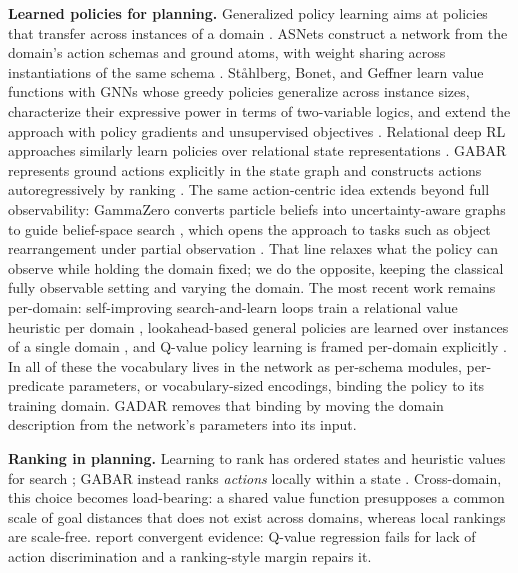 \documentclass[letterpaper]{article} %
\newcommand{\gadar}{GADAR}                 %
\begin{document}
\textbf{Learned policies for planning.} Generalized policy learning aims at
policies that transfer across instances of a domain
\citep{approx_Policy_iter, relational_rl}. ASNets construct a network from
the domain's action schemas and ground atoms, with weight sharing across
instantiations of the same schema \citep{toyer2020asnets}. St{\aa}hlberg,
Bonet, and Geffner learn value functions with GNNs whose greedy policies
generalize across instance sizes, characterize their expressive power in
terms of two-variable logics, and extend the approach with policy gradients
and unsupervised objectives \citep{expressive_v1, unsupervised_gnn,
policy_gradients, policy_beyond_c2}. Relational deep RL approaches
similarly learn policies over relational state representations
\citep{relational_drl, sr_drl, relational_mdp_learning, rddl_gnn,
generalized_planning_deep_rl}. GABAR represents ground actions explicitly in the
state graph and constructs actions autoregressively by ranking
\citep{gabar}. The same action-centric idea extends beyond full
observability: GammaZero converts particle beliefs into uncertainty-aware
graphs to guide belief-space search \citep{gammazero}, which opens the
approach to tasks such as object rearrangement under partial observation
\citep{hoo_pomdp}. That line relaxes what the policy can observe while
holding the domain fixed; we do the opposite, keeping the classical
fully observable setting and varying the domain. The most recent work remains per-domain: self-improving
search-and-learn loops train a relational value heuristic per domain
\citep{learning_to_search_2026}, lookahead-based general policies are
learned over instances of a single domain
\citep{lookahead_policies_2026}, and Q-value policy learning is framed
per-domain explicitly \citep{mueller_qvalues}. In all of these the
vocabulary lives in the network as per-schema modules, per-predicate
parameters, or vocabulary-sized encodings, binding the policy to its
training domain. \gadar{} removes that binding by moving the domain
description from the network's parameters into its input.

\textbf{Ranking in planning.} Learning to rank has ordered states and
heuristic values for search \citep{ranking_old_2009, ranking_og,
chrestien_optimize, gbfs_v2}; GABAR instead ranks \emph{actions} locally
within a state \citep{gabar}. Cross-domain, this choice becomes
load-bearing: a shared value function presupposes a common scale of goal
distances that does not exist across domains, whereas local rankings are
scale-free. \citet{mueller_qvalues} report convergent evidence: Q-value
regression fails for lack of action discrimination and a ranking-style
margin repairs it.
\end{document}
